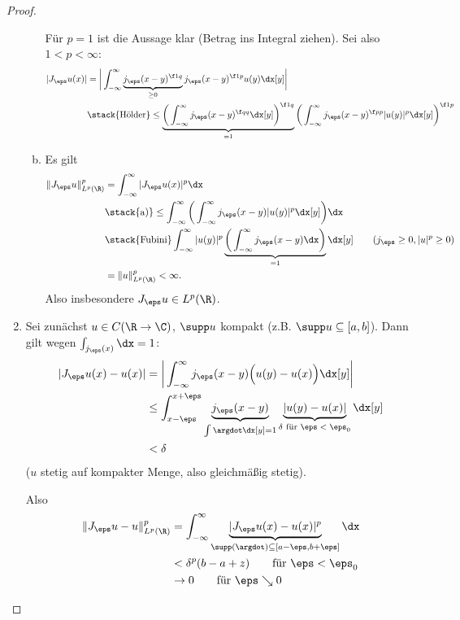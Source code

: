 \begin{st}
\begin{proof}
\begin{enumerate}[1)]
\begin{enumerate}[a)]
						Für $p=1$ ist die Aussage klar (Betrag ins Integral ziehen).
						Sei also $1 < p < \infty$:
						\begin{align*}
							|J_\eps u(x)|
							&= \bigg| \int_{-\infty}^\infty \underbrace{j_\eps(x-y)^{\f 1q}}_{\ge 0} j_\eps(x-y)^{\f 1p} u(y) \dx[y] \bigg| \\
							&\stack{\text{Hölder}}\le \underbrace{\bigg( \int_{-\infty}^\infty j_\eps(x-y)^{\f qq} \dx[y] \bigg)^{\f 1q}}_{=1} \bigg( \int_{-\infty}^\infty j_\eps(x-y)^{\f pp} |u(y)|^p \dx[y] \bigg)^{\f 1p}
						\end{align*}
					\item
						Es gilt
						\begin{align*}
							\| J_\eps u \|_{L^p(\R)}^p
							&= \int_{-\infty}^\infty |J_\eps u(x)|^p \dx \\
							&\stack{\text{a)}}\le \int_{-\infty}^\infty \bigg( \int_{-\infty}^\infty j_\eps(x-y) |u(y)|^p \dx[y] \bigg) \dx \\
							&\stack{\text{Fubini}} \int_{-\infty}^\infty |u(y)|^p \underbrace{\bigg( \int_{-\infty}^\infty j_\eps(x-y) \dx \bigg)}_{=1} \dx[y] \qquad \text{($j_\eps \ge 0, |u|^p \ge 0$)} \\
							&= \|u\|_{L^p(\R)}^p < \infty.
						\end{align*}
						Also insbesondere $J_\eps u \in L^p(\R)$.
				\end{enumerate}
			\item
				Sei zunächst $u \in C(\R \to \C)$, $\supp u$ kompakt (z.B. $\supp u \subset [a,b]$).
				Dann gilt wegen $\int_{j_\eps(x)} \dx = 1$:
				\begin{align*}
					|J_\eps u(x) - u(x)|
					&= \bigg| \int_{-\infty}^\infty j_\eps(x-y) \Big(u(y) - u(x)\Big) \dx[y] \bigg| \\
					&\le \int_{x-\eps}^{x+\eps} \underbrace{j_\eps(x-y)}_{\int \argdot \dx[y] = 1} \underbrace{|u(y)-u(x)|}_{\delta \text{ für $\eps < \eps_0$}} \dx[y] \\
					&< \delta
				\end{align*}
				($u$ stetig auf kompakter Menge, also gleichmäßig stetig).

				Also
				\begin{align*}
					\|J_\eps u - u\|_{L^p(\R)}^p
					&= \int_{-\infty}^\infty \underbrace{|J_\eps u(x) - u(x)|^p}_{\supp(\argdot) \subset [a-\eps, b+ \eps]} \dx \\
					&< \delta^p (b-a +z) \qquad \text{für $\eps < \eps_0$} \\
					&\to 0 \qquad \text{für $\eps \searrow 0$}
				\end{align*}
		\end{enumerate}
	\end{proof}
\end{st}

